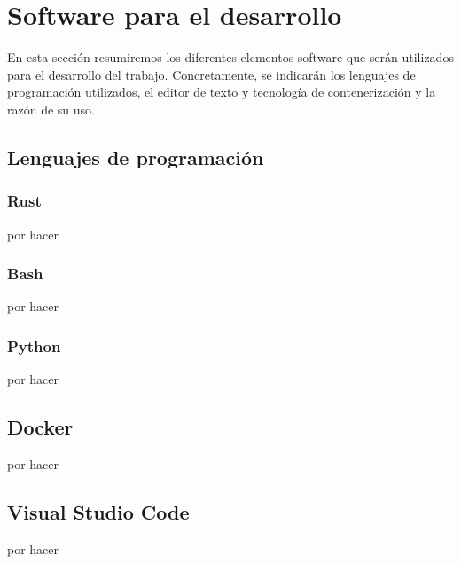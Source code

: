 \section{Software para el desarrollo}

En esta sección resumiremos los diferentes elementos software que serán utilizados para el desarrollo del trabajo. Concretamente, se indicarán los lenguajes de programación utilizados, el editor de texto y tecnología de contenerización y la razón de su uso.

\subsection{Lenguajes de programación}

\subsubsection{Rust}

por hacer

\subsubsection{Bash}

por hacer

\subsubsection{Python}

por hacer

\subsection{Docker}

por hacer

\subsection{Visual Studio Code}

por hacer
